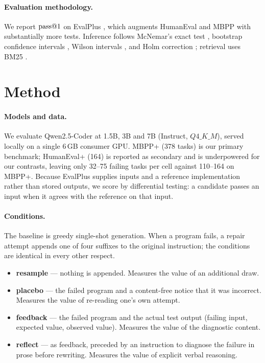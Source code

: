 \paragraph{Evaluation methodology.}
We report $\mathrm{pass}@1$ \cite{chen2021codex} on EvalPlus \cite{liu2023evalplus},
which augments HumanEval \cite{chen2021codex} and MBPP
\cite{austin2021mbpp} with substantially more tests. Inference follows
McNemar's exact test \cite{mcnemar1947}, bootstrap confidence intervals
\cite{efron1979bootstrap}, Wilson intervals \cite{wilson1927}, and Holm
correction \cite{holm1979}; retrieval uses BM25 \cite{robertson2009bm25}.

\section{Method}
\label{sec:method}

\paragraph{Models and data.}
We evaluate Qwen2.5-Coder \cite{hui2024qwencoder} at 1.5B, 3B and 7B
(Instruct, $Q4\_K\_M$), served locally on a single 6\,GB consumer GPU. MBPP+
(378 tasks) is our primary benchmark; HumanEval+ (164) is reported as
secondary and is underpowered for our contrasts, leaving only 32--75 failing
tasks per cell against 110--164 on MBPP+. Because EvalPlus supplies inputs and
a reference implementation rather than stored outputs, we score by differential
testing: a candidate passes an input when it agrees with the reference on that
input.

\paragraph{Conditions.}
The baseline is greedy single-shot generation. When a program fails, a repair
attempt appends one of four suffixes to the original instruction; the
conditions are identical in every other respect.

\begin{itemize}\itemsep2pt
  \item \textbf{resample} --- nothing is appended. Measures the value of an
  additional draw.
  \item \textbf{placebo} --- the failed program and a content-free notice that
  it was incorrect. Measures the value of re-reading one's own attempt.
  \item \textbf{feedback} --- the failed program and the actual test output
  (failing input, expected value, observed value). Measures the value of the
  diagnostic content.
  \item \textbf{reflect} --- as feedback, preceded by an instruction to
  diagnose the failure in prose before rewriting. Measures the value of
  explicit verbal reasoning.
\end{itemize}

